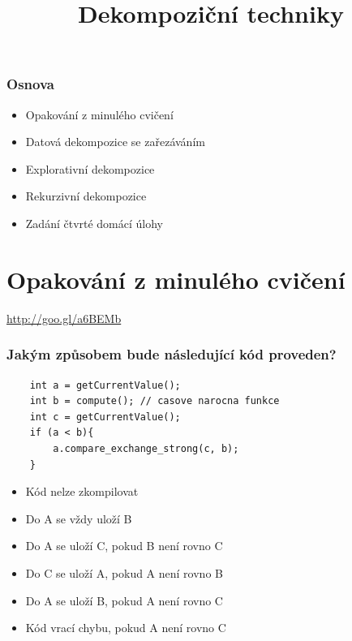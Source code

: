 \documentclass[usenames,dvipsnames,9pt]{beamer}
\title{Dekompoziční techniky}
\date{}
\institute{B4B36PDV -- Paralelní a distribuované výpočty}
\begin{document}
\maketitle


%  
%
%
%

\begin{frame}
  \frametitle{Osnova}
  \begin{itemize}
    \item Opakování z minulého cvičení
    \item Datová dekompozice se zařezáváním
    \item Explorativní dekompozice
    \item Rekurzivní dekompozice\\[1.5em]
    \item Zadání čtvrté domácí úlohy
  \end{itemize}
\end{frame}

\section{Opakování z minulého cvičení}
\begin{frame}[standout]
  \Huge
  \url{http://goo.gl/a6BEMb}
\end{frame}

\begin{frame}[fragile]

\frametitle{Jakým způsobem bude následující kód proveden?}

	\begin{verbatim}
	int a = getCurrentValue();
	int b = compute(); // casove narocna funkce
	int c = getCurrentValue();
	if (a < b){
		a.compare_exchange_strong(c, b);
	}
	\end{verbatim}
	
	\vspace{2em}
	\begin{itemize}
	\item Kód nelze zkompilovat
	\item Do A se vždy uloží B
	\item Do A se uloží C, pokud B není rovno C
	\item Do C se uloží A, pokud A není rovno B
	\item Do A se uloží B, pokud A není rovno C
	\item Kód vrací chybu, pokud A není rovno C
	\end{itemize}

\end{frame}
\end{document}
